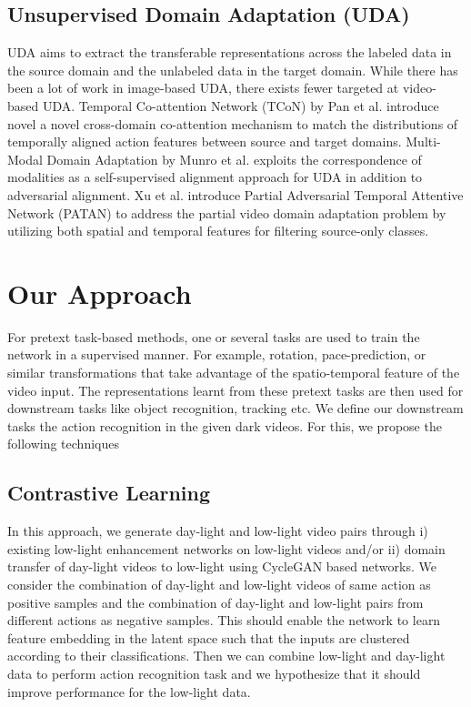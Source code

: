 \documentclass[conference]{IEEEtran}
\begin{document}
\subsection{Unsupervised Domain Adaptation (UDA)}
UDA aims to extract the transferable representations across the labeled data in the source domain and the unlabeled data in the target domain. While there has been a lot of work in image-based UDA, there exists fewer targeted at video-based UDA. Temporal Co-attention Network (TCoN) by Pan et al. \cite{Pan2020AdversarialCA} introduce novel a novel cross-domain co-attention mechanism to match the distributions of temporally aligned action features between source and target domains. Multi-Modal Domain Adaptation by Munro et al. \cite{Munro2019MultiModalDA} exploits the correspondence of modalities as a self-supervised alignment approach for UDA in addition to adversarial alignment. Xu et al. introduce Partial Adversarial Temporal Attentive Network (PATAN) \cite{Xu2021PartialVD} to address the partial video domain adaptation problem by utilizing both spatial and temporal features for filtering source-only classes.

\section{Our Approach}
For pretext task-based methods, one or several tasks are used to train the network in a supervised manner. For example, rotation, pace-prediction, or similar transformations that take advantage of the spatio-temporal feature of the video input. The representations learnt from these pretext tasks are then used for downstream tasks like object recognition, tracking etc. We define our downstream tasks the action recognition in the given dark videos. For this, we propose the following techniques

\subsection{Contrastive Learning}
In this approach, we generate day-light and low-light video pairs through i) existing low-light enhancement networks on low-light videos and/or ii) domain transfer of day-light videos to low-light using CycleGAN based networks. We consider the combination of day-light and low-light videos of same action as positive samples and the combination of day-light and low-light pairs from different actions as negative samples. This should enable the network to learn feature embedding in the latent space such that the inputs are clustered according to their classifications. Then we can combine low-light and day-light data to perform action recognition task and we hypothesize that it should improve performance for the low-light data.
\end{document}
